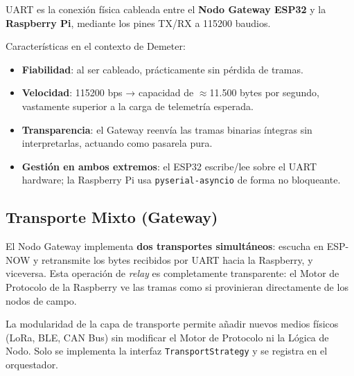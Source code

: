 UART es la conexión física cableada entre el \textbf{Nodo Gateway ESP32} y la
\textbf{Raspberry Pi}, mediante los pines TX/RX a 115200 baudios.

Características en el contexto de Demeter:
\begin{itemize}[leftmargin=*, label=--]
    \item \textbf{Fiabilidad}: al ser cableado, prácticamente sin pérdida de tramas.
    \item \textbf{Velocidad}: 115200 bps → capacidad de $\approx$11.500 bytes por segundo,
          vastamente superior a la carga de telemetría esperada.
    \item \textbf{Transparencia}: el Gateway reenvía las tramas binarias íntegras sin
          interpretarlas, actuando como pasarela pura.
    \item \textbf{Gestión en ambos extremos}: el ESP32 escribe/lee sobre el UART hardware;
          la Raspberry Pi usa \texttt{pyserial-asyncio} de forma no bloqueante.
\end{itemize}

\subsection{Transporte Mixto (Gateway)}

El Nodo Gateway implementa \textbf{dos transportes simultáneos}: escucha en ESP-NOW y
retransmite los bytes recibidos por UART hacia la Raspberry, y viceversa. Esta operación
de \textit{relay} es completamente transparente: el Motor de Protocolo de la Raspberry
ve las tramas como si provinieran directamente de los nodos de campo.

\begin{designnote}
La modularidad de la capa de transporte permite añadir nuevos medios físicos (LoRa, BLE, CAN Bus)
sin modificar el Motor de Protocolo ni la Lógica de Nodo. Solo se implementa la interfaz
\texttt{TransportStrategy} y se registra en el orquestador.
\end{designnote}
